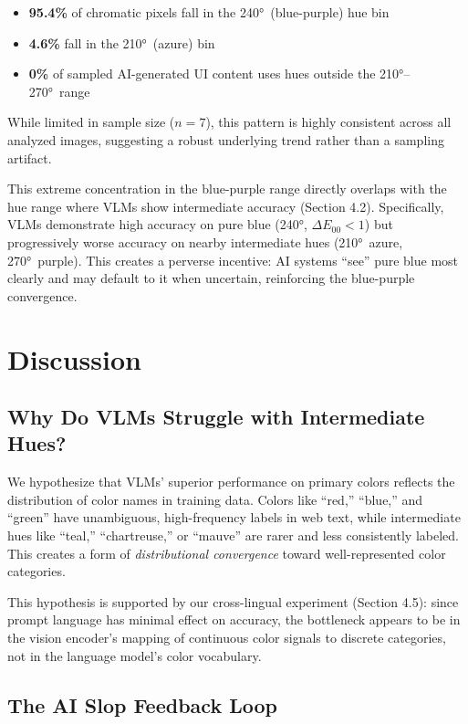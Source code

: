 \documentclass[11pt,a4paper]{article}
\begin{document}
\begin{itemize}
    \item \textbf{95.4\%} of chromatic pixels fall in the 240°\ (blue-purple) hue bin
    \item \textbf{4.6\%} fall in the 210°\ (azure) bin
    \item \textbf{0\%} of sampled AI-generated UI content uses hues outside the 210°--270°\ range
\end{itemize}

While limited in sample size ($n = 7$), this pattern is highly consistent across all analyzed images, suggesting a robust underlying trend rather than a sampling artifact.

This extreme concentration in the blue-purple range directly overlaps with the hue range where VLMs show intermediate accuracy (Section 4.2). Specifically, VLMs demonstrate high accuracy on pure blue (240°, $\Delta E_{00} < 1$) but progressively worse accuracy on nearby intermediate hues (210°\ azure, 270°\ purple). This creates a perverse incentive: AI systems ``see'' pure blue most clearly and may default to it when uncertain, reinforcing the blue-purple convergence.

\section{Discussion}

\subsection{Why Do VLMs Struggle with Intermediate Hues?}

We hypothesize that VLMs' superior performance on primary colors reflects the distribution of color names in training data. Colors like ``red,'' ``blue,'' and ``green'' have unambiguous, high-frequency labels in web text, while intermediate hues like ``teal,'' ``chartreuse,'' or ``mauve'' are rarer and less consistently labeled. This creates a form of \textit{distributional convergence} \cite{bommasani2021} toward well-represented color categories.

This hypothesis is supported by our cross-lingual experiment (Section 4.5): since prompt language has minimal effect on accuracy, the bottleneck appears to be in the vision encoder's mapping of continuous color signals to discrete categories, not in the language model's color vocabulary.

\subsection{The AI Slop Feedback Loop}
\end{document}
